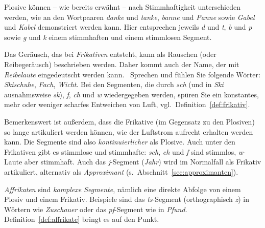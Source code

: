 Plosive können -- wie bereits erwähnt -- nach Stimmhaftigkeit unterschieden werden, wie an den Wortpaaren \textit{danke} und \textit{tanke}, \textit{banne} und \textit{Panne} sowie \textit{Gabel} und \textit{Kabel} demonstriert werden kann.
Hier entsprechen jeweils \textit{d} und \textit{t}, \textit{b} und \textit{p} sowie \textit{g} und \textit{k} einem stimmhaften und einem stimmlosen Segment.

Das Geräusch, das bei \textit{Frikativen} entsteht, kann als Rauschen (oder Reibegeräusch) beschrieben werden.
Daher kommt auch der Name, der mit \textit{Reibelaute} eingedeutscht werden kann.
\TuBegin~Sprechen und fühlen Sie folgende Wörter: \textit{Skischuhe}, \textit{Fach}, \textit{Wicht}.
Bei den Segmenten, die durch \textit{sch} (und in \textit{Ski} ausnahmsweise \textit{sk}), \textit{f}, \textit{ch} und \textit{w} wiedergegeben werden, spüren Sie ein konstantes, mehr oder weniger scharfes Entweichen von Luft, vgl.\ Definition~\ref{def:frikativ}.

\Stretch


Bemerkenswert ist außerdem, dass die Frikative (im Gegensatz zu den Plosiven) so lange artikuliert werden können, wie der Luftstrom aufrecht erhalten werden kann.
Die Segmente sind also \textit{kontinuierlicher} als Plosive.
Auch unter den Frikativen gibt es stimmlose und stimmhafte: \textit{sch}, \textit{ch} und \textit{f} sind stimmlos, \textit{w}-Laute aber \zB stimmhaft.
Auch das \textit{j}-Segment (\textit{Jahr}) wird im Normalfall als Frikativ artikuliert, alternativ als \textit{Approximant} (s.\ Abschnitt~\ref{sec:approximanten}).

\textit{Affrikaten} sind \textit{komplexe Segmente}, nämlich eine direkte Abfolge von einem Plosiv und einem Frikativ.
Beispiele sind das \textit{ts}-Segment (orthographisch \textit{z}) in Wörtern wie \textit{Zuschauer} oder das \textit{pf}-Segment wie in \textit{Pfund}.
Definition~\ref{def:affrikate} bringt es auf den Punkt.

\Stretch


